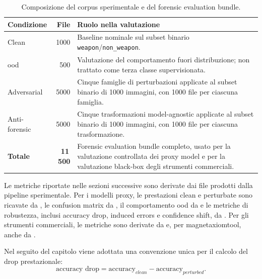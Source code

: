 \begin{table}[H]
\centering
\caption{Composizione del corpus sperimentale e del forensic evaluation bundle.}
\label{tab:results-corpus-composition}
\begin{tabularx}{0.90\textwidth}{@{}l r X@{}}
\toprule
\textbf{Condizione} & \textbf{File} & \textbf{Ruolo nella valutazione} \\
\midrule

Clean
&
1000
&
Baseline nominale sul subset binario \texttt{weapon}/\texttt{non\_weapon}. \\

\gls{ood}
&
500
&
Valutazione del comportamento fuori distribuzione; non trattato come terza
classe supervisionata. \\

Adversarial
&
5000
&
Cinque famiglie di perturbazioni applicate al subset binario di 1000 immagini,
con 1000 file per ciascuna famiglia. \\

Anti-forensic
&
5000
&
Cinque trasformazioni model-agnostic applicate al subset binario di 1000
immagini, con 1000 file per ciascuna trasformazione. \\

\midrule
\textbf{Totale}
&
\textbf{11\,500}
&
Forensic evaluation bundle completo, usato per la valutazione controllata dei
proxy model e per la valutazione black-box degli strumenti commerciali. \\

\bottomrule
\end{tabularx}
\end{table}

Le metriche riportate nelle sezioni successive sono derivate dai file prodotti
dalla pipeline sperimentale. Per i modelli proxy, le prestazioni clean e
perturbate sono ricavate da ,
le confusion matrix da
, il comportamento
\gls{ood} da  e le metriche di
robustezza, inclusi accuracy drop, induced errors e confidence shift, da
. Per gli strumenti
commerciali, le metriche sono derivate da
 e, per
\gls{magnetaxiomtool}, anche da
.

Nel seguito del capitolo viene adottata una convenzione unica per il calcolo del
drop prestazionale:
\[
\text{accuracy drop} =
\text{accuracy}_{clean} - \text{accuracy}_{perturbed}.
\]


